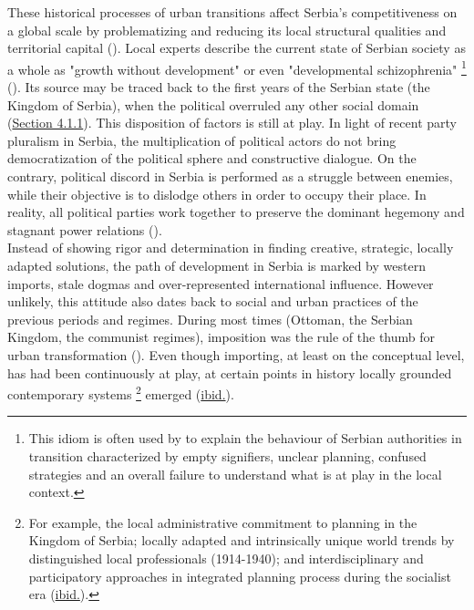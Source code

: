 \documentclass[11pt]{report}
\begin{document}
{{{{These historical processes of urban transitions affect Serbia’s competitiveness on a global scale by problematizing and reducing its local structural qualities and territorial capital (\href{Vujosevic}{\citealt{vujosevic_conundrum_2012}}). Local experts describe the current state of Serbian society as a whole as "growth without development" or even "developmental schizophrenia"
\footnote{This idiom is often used by \href{Vujosevic}{\cite{vujosevic_postsocijalisticka_2010}} to explain the behaviour of Serbian authorities in transition characterized by empty signifiers, unclear planning, confused strategies and an overall failure to understand what is at play in the local context.} (\href{ref}{\citealt{vujosevic_collapse_2010}}).
Its source may be traced back to the first years of the Serbian state (the Kingdom of Serbia), when the political overruled any other social domain (\href{Section 4.1.1}{Section 4.1.1}). This disposition of factors is still at play. In light of recent party pluralism in Serbia, the multiplication of political actors do not bring democratization of the political sphere and constructive dialogue.   On the contrary, political discord in Serbia is performed as a struggle between enemies, while their objective is to dislodge others in order to occupy their place. In reality, all political parties work together to preserve the dominant hegemony and stagnant power relations (\href{Mouffe}{\citealt{mouffe_which_2002}}).
\\

Instead of showing rigor and determination in finding creative, strategic, locally adapted solutions, the path of development in Serbia is marked by western imports, stale dogmas and over-represented international influence. However unlikely, this attitude also dates back to social and urban practices of the previous periods and regimes. During most times (Ottoman, the Serbian Kingdom, the communist regimes), imposition was the rule of the thumb for urban transformation (\href{Nedovic}{\citealt{nedovicbudic_waves_2006}}). Even though importing, at least on the conceptual level, has had been continuously at play, at certain points in history locally grounded contemporary systems
\footnote{For example, the local administrative commitment to planning in the Kingdom of Serbia; locally adapted and intrinsically unique world trends by distinguished local professionals (1914-1940); and interdisciplinary and participatory approaches in integrated planning process during the socialist era (\href{Nedovic}{ibid.}).}
emerged (\href{Nedovic}{ibid.}).
\\

}}}}
\end{document}
